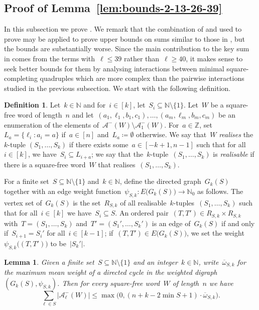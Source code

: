 \documentclass[12pt]{article}
\theoremstyle{plain}
\newtheorem{lemma}[theorem]{Lemma}
\theoremstyle{definition}
\newtheorem{definition}[theorem]{Definition}
\newcommand\N{\mathbb{N}}
\newcommand{\coleq}{\coloneq}
\newcommand{\Z}{\mathbb Z}
\newcommand{\cA}{\mathcal A}
\newcommand{\g}{\psi_{S,k}}
\newcommand{\bwsk}{\overline\omega_{S,k}}
\newcommand{\subs}{\subseteq}
\newcommand{\sm}{\setminus}
\newcommand{\abs}[1]{\mathopen{}\left\lvert#1\right\rvert\mathclose{}}
\begin{document}
	\subsection{Proof of Lemma~\ref{lem:bounds-2-13-26-39}} \label{ssec:proof-bounds-2-13-26-39}
	
	In this subsection we prove . We remark that the combination of  and  used to prove  may be applied to prove upper bounds on sums similar to those in , but the bounds are substantially worse. Since the main contribution to the key sum in  comes from the terms with~$\ell\le39$ rather than~$\ell\ge40$, it makes sense to seek better bounds for them by analysing interactions between minimal square-completing quadruples which are more complex than the pairwise interactions studied in the previous subsection. We start with the following definition.
	
	\begin{definition}\label{def:realise}
		Let~$k\in\N$ and for~$i\in[k]$, let~$S_i\subs\N\sm\{1\}$. Let~$W$ be a square-free word of length~$n$ and let~$(a_1,\ell_1,b_1,c_1),\dots,(a_m,\ell_m,b_m,c_m)$ be an enumeration of the elements of~$\cA^{-}(W)\sm\cA^{-}_1(W)$. For~$a\in\Z$, set~$L_a = \{\ell_i:a_i=a\}$ if~$a\in[n]$ and~$L_a\coleq\emptyset$ otherwise. We say that~$W$ \emph{realises} the~$k$-tuple $(S_1,\dots,S_k)$ if there exists some~$a\in[-k+1,n-1]$ such that for all~$i\in[k]$, we have~$S_i\subs L_{i+a}$; we say that the~$k$-tuple~$(S_1,\dots,S_k)$ is \emph{realisable} if there is a square-free word~$W$ that realises~$(S_1,\dots,S_k)$.
	\end{definition}
	
	For a finite set~$S\subs\N\sm\{1\}$ and~$k\in\N$, define the directed graph~$G_k(S)$ together with an edge weight function~$\g\colon E\big(G_k(S)\big)\to\N_0$ as follows. The vertex set of~$G_k(S)$ is the set~$R_{S,k}$ of all realisable~$k$-tuples~$(S_1,\dots,S_k)$ such that for all~$i\in[k]$ we have~$S_i\subs S$. An ordered pair~$(T,T')\in R_{S,k}\times R_{S,k}$ with~$T=(S_1,\dots,S_k)$ and~$T'=(S_1',\dots,S_k')$ is an edge of~$G_k(S)$ if and only if~$S_{i+1}=S_i'$ for all~$i\in[k-1]$; if~$(T,T')\in E\big(G_k(S)\big)$, we set the weight~$\g\big((T,T')\big)$ to be~$\abs{S_k'}$.
	
	\begin{lemma} \label{lem:bound-max-mean-weight-cycle}
		Given a finite set~$S\subs\N\sm\{1\}$ and an integer~$k\in\N$, write~$\bwsk$ for the maximum mean weight of a directed cycle in the weighted digraph $(G_k(S),\g)$. Then for every square-free word~$W$ of length~$n$ we have
		\[\sum_{\ell\in S}\abs{\cA^{-}_{\ell}(W)}\le \max\big(0,(n+k-2\min S+1)\cdot\bwsk\big).\]
	\end{lemma}
	
\end{document}
